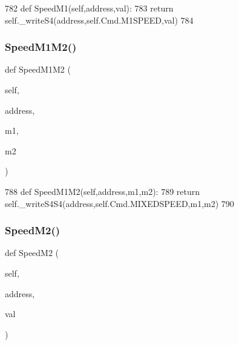 \begin{DoxyCode}
782     \textcolor{keyword}{def }SpeedM1(self,address,val):
783         \textcolor{keywordflow}{return} self.\_writeS4(address,self.Cmd.M1SPEED,val)
784 
\end{DoxyCode}
\mbox{\label{classtoxic__hardware_1_1roboclaw__3_1_1Roboclaw_ae8f0e90249e078ce5de6930dbabb338d}} 
\subsubsection{\texorpdfstring{Speed\+M1\+M2()}{SpeedM1M2()}}
{\footnotesize\ttfamily def Speed\+M1\+M2 (\begin{DoxyParamCaption}\item[{}]{self,  }\item[{}]{address,  }\item[{}]{m1,  }\item[{}]{m2 }\end{DoxyParamCaption})}


\begin{DoxyCode}
788     \textcolor{keyword}{def }SpeedM1M2(self,address,m1,m2):
789         \textcolor{keywordflow}{return} self.\_writeS4S4(address,self.Cmd.MIXEDSPEED,m1,m2)
790 
\end{DoxyCode}
\mbox{\label{classtoxic__hardware_1_1roboclaw__3_1_1Roboclaw_afa7cb556973974794bc2d040eabde676}} 
\subsubsection{\texorpdfstring{Speed\+M2()}{SpeedM2()}}
{\footnotesize\ttfamily def Speed\+M2 (\begin{DoxyParamCaption}\item[{}]{self,  }\item[{}]{address,  }\item[{}]{val }\end{DoxyParamCaption})}


